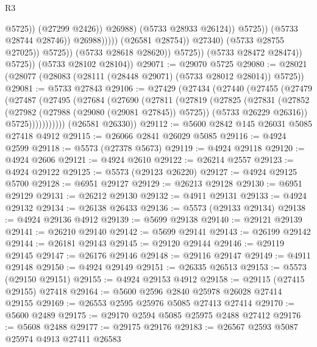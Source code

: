\begin{lexlean}{R3}
\begin{coremodule}
                                                      @5725))
                                                  (@27299 @2426))
                                                @26988)
                                              (@5733 @28933 @26124))
                                            @5725))
                                        (@5733 @28744 @28746))
                                      @26988)))))
                            (@26581 @28754))
                          @27340)
                        (@5733 @28755 @27025))
                      @5725))
                  (@5733 @28618 @28620))
                @5725))
            (@5733 @28472 @28474))
          @5725))
      (@5733 @28102 @28104))
@29071 := @29070 @5725
@29080 := @28021 (@28077 (@28083 (@28111 (@28448 @29071) (@5733 @28012 @28014)) @5725))
@29081 := @5733 @27843
@29106 := @27429
    (@27434
      (@27440
        (@27455
          (@27479
            (@27487
              (@27495
                (@27684
                  (@27690
                    (@27811
                      (@27819
                        (@27825
                          (@27831
                            (@27852
                              (@27982 (@27988 (@29080 (@29081 @27845)) @5725))
                              (@5733 @26229 @26316))
                            @5725)))))))))))
      (@26581 @26330))
@29112 := @5600 @2842 @145 @26031 @5085 @27418 @4912
@29115 := @26066 @2841 @26029 @5085
@29116 := @4924 @2599
@29118 := @5573 (@27378 @5673)
@29119 := @4924 @29118
@29120 := @4924 @2606
@29121 := @4924 @2610
@29122 := @26214 @2557
@29123 := @4924 @29122
@29125 := @5573 (@29123 @26220)
@29127 := @4924 @29125 @5700
@29128 := @6951 @29127
@29129 := @26213 @29128
@29130 := @6951 @29129
@29131 := @26212 @29130
@29132 := @4911 @29131
@29133 := @4924 @29132
@29134 := @26138 @26433
@29136 := @5573 (@29133 @29134)
@29138 := @4924 @29136 @4912
@29139 := @5699 @29138
@29140 := @29121 @29139
@29141 := @26210 @29140
@29142 := @5699 @29141
@29143 := @26199 @29142
@29144 := @26181 @29143
@29145 := @29120 @29144
@29146 := @29119 @29145
@29147 := @26176 @29146
@29148 := @29116 @29147
@29149 := @4911 @29148
@29150 := @4924 @29149
@29151 := @26335 @26513
@29153 := @5573 (@29150 @29151)
@29155 := @4924 @29153 @4912
@29158 := @29115 (@27415 @29155) @27418
@29164 := @5600 @2596 @2840 @25978 @26028 @27414 @29155
@29169 := @26553 @2595 @25976 @5085 @27413 @27414
@29170 := @5600 @2489
@29175 := @29170 @2594 @5085 @25975 @2488 @27412
@29176 := @5608 @2488
@29177 := @29175 @29176
@29183 := @26567 @2593 @5087 @25974 @4913 @27411 @26583

\end{coremodule}
\end{lexlean}
